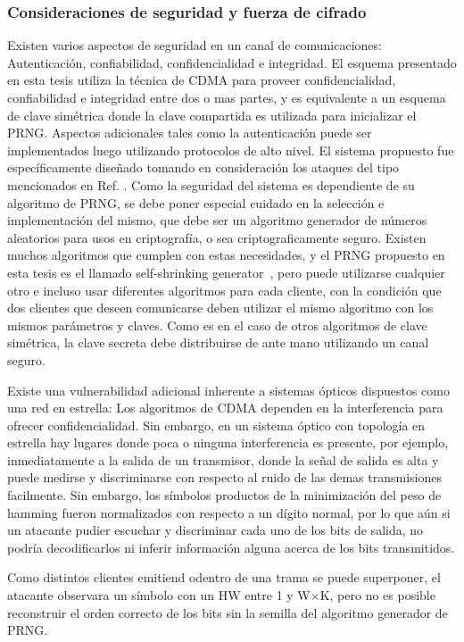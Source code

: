 \subsubsection{Consideraciones de seguridad y fuerza de cifrado}\label{security}
Existen varios aspectos de seguridad en un canal de comunicaciones: Autenticación, confiabilidad, confidencialidad e integridad.
El esquema presentado en esta tesis utiliza la técnica de CDMA para proveer confidencialidad, confiabilidad e integridad entre dos o mas partes, y es equivalente a un esquema de clave simétrica donde la clave compartida es utilizada para inicializar el PRNG. Aspectos adicionales tales como la autenticación puede ser implementados luego utilizando protocolos de alto nivel.
El sistema propuesto fue específicamente diseñado tomando en consideración los ataques del tipo mencionados en Ref. \cite{Shake:05}.
Como la seguridad del sistema es dependiente de su algoritmo de PRNG, se debe poner especial cuidado en la selección e implementación del mismo, que debe ser un algoritmo generador de números aleatorios para usos en criptografía, o sea criptograficamente seguro. Existen muchos algoritmos que cumplen con estas necesidades, y el PRNG propuesto en esta tesis es el llamado self-shrinking generator~\cite{Meier:94}, pero puede utilizarse cualquier otro e incluso usar diferentes algoritmos para cada cliente, con la condición que dos clientes que deseen comunicarse deben utilizar el mismo algoritmo con los mismos parámetros y claves.
Como es en el caso de otros algoritmos de clave simétrica, la clave secreta debe distribuirse de ante mano utilizando un canal seguro.

Existe una vulnerabilidad adicional inherente a sistemas ópticos dispuestos como una red en estrella: Los algoritmos de CDMA dependen en la interferencia para ofrecer confidencialidad. Sin embargo, en un sistema óptico con topología en estrella hay lugares donde poca o ninguna interferencia es presente, por ejemplo, inmediatamente a la salida de un transmisor, donde la señal de salida es alta y puede medirse y discriminarse con respecto al ruido de las demas transmisiones facilmente.
Sin embargo, los símbolos productos de la minimización del peso de hamming fueron normalizados con respecto a un dígito normal, por lo que aún si un atacante pudier escuchar y discriminar cada uno de los bits de salida, no podría decodificarlos ni inferir información alguna acerca de los bits transmitidos.

Como distintos clientes emitiend odentro de una trama se puede superponer, el atacante observara un símbolo con un HW entre 1 y W$\times$K, pero no es posible reconstruir el orden correcto de los bits sin la semilla del algoritmo generador de PRNG.

